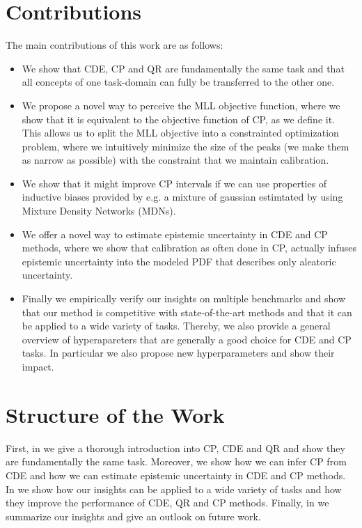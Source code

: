 \section{Contributions}\label{sec:contributions}

The main contributions of this work are as follows:

\begin{itemize}
    \item We show that CDE, CP and QR are fundamentally the same task and that all concepts of one task-domain can fully be transferred to the other one.
    \item We propose a novel way to perceive the MLL objective function, where we show that it is equivalent to the objective function of CP, as we define it. This allows us to split the MLL objective into a constrainted optimization problem, where we intuitively minimize the size of the peaks (we make them as narrow as possible) with the constraint that we maintain calibration.
    \item We show that it might improve CP intervals if we can use properties of inductive biases provided by e.g. a mixture of gaussian estimtated by using Mixture Density Networks (MDNs).
    \item We offer a novel way to estimate epistemic uncertainty in CDE and CP methods, where we show that calibration as often done in CP, actually infuses epistemic uncertainty into the modeled PDF that describes only aleatoric uncertainty.
    \item Finally we empirically verify our insights on multiple benchmarks and show that our method is competitive with state-of-the-art methods and that it can be applied to a wide variety of tasks. Thereby, we also provide a general overview of hyperapareters that are generally a good choice for CDE and CP tasks. In particular we also propose new hyperparameters and show their impact.
\end{itemize}

\section{Structure of the Work}\label{sec:structure}

First, in  we give a thorough introduction into CP, CDE and QR and show they are fundamentally the same task. Moreover, we show how we can infer CP from CDE and how we can estimate epistemic uncertainty in CDE and CP methods. In  we show how our insights can be applied to a wide variety of tasks and how they improve the performance of CDE, QR and CP methods. Finally, in  we summarize our insights and give an outlook on future work.

